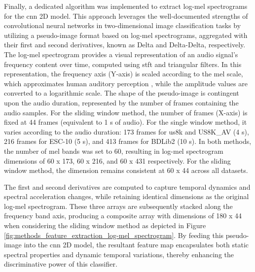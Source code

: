 Finally, a dedicated algorithm was implemented to extract log-mel spectrograms for the \gls{cnn} 2D model. This approach leverages the well-documented strengths of convolutional neural networks in two-dimensional image classification tasks by utilizing a pseudo-image format based on log-mel spectrograms, aggregated with their first and second derivatives, known as Delta and Delta-Delta, respectively. The log-mel spectrogram provides a visual representation of an audio signal's frequency content over time, computed using \gls{stft} and triangular filters. In this representation, the frequency axis (Y-axis) is scaled according to the mel scale, which approximates human auditory perception \cite{Moore2013}, while the amplitude values are converted to a logarithmic scale. The shape of the pseudo-image is contingent upon the audio duration, represented by the number of frames containing the audio samples. For the sliding window method, the number of frames (X-axis) is fixed at 44 frames (equivalent to 1 \gls{s} of audio). For the single window method, it varies according to the audio duration: 173 frames for \gls{us8k} and US8K\_AV (4 \gls{s}), 216 frames for ESC-10 (5 \gls{s}), and 413 frames for BDLib2 (10 \gls{s}). In both methods, the number of mel bands was set to 60, resulting in log-mel spectrogram dimensions of 60 x 173, 60 x 216, and 60 x 431 respectively. For the sliding window method, the dimension remains consistent at 60 x 44 across all datasets.

The first and second derivatives are computed to capture temporal dynamics and spectral acceleration changes, while retaining identical dimensions as the original log-mel spectrogram. These three arrays are subsequently stacked along the frequency band axis, producing a composite array with dimensions of 180 x 44 when considering the sliding window method as depicted in Figure \ref{fig:methods_feature_extraction_log-mel_spectrogram}. By feeding this pseudo-image into the \gls{cnn} 2D model, the resultant feature map encapsulates both static spectral properties and dynamic temporal variations, thereby enhancing the discriminative power of this classifier.


